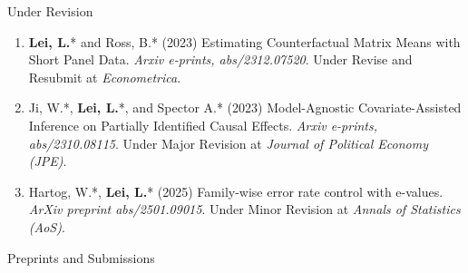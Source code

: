 \documentclass{article}
\begin{document}
\begin{large}
\noindent Under Revision
\end{large}

\begin{enumerate}
\item \textbf{Lei, L.}* and Ross, B.* (2023) Estimating Counterfactual Matrix Means with Short Panel Data. \emph{Arxiv e-prints, abs/2312.07520}. Under Revise and Resubmit at \emph{Econometrica}.
\item Ji, W.*, \textbf{Lei, L.}*, and Spector A.* (2023) Model-Agnostic Covariate-Assisted Inference on Partially Identified Causal Effects. \emph{Arxiv e-prints, abs/2310.08115}. Under Major Revision at \emph{Journal of Political Economy (JPE)}.
\item Hartog, W.*, \textbf{Lei, L.}* (2025) Family-wise error rate control with e-values. \emph{ArXiv preprint abs/2501.09015}. Under Minor Revision at \emph{Annals of Statistics (AoS)}.
\end{enumerate}

\begin{large}
\noindent Preprints and Submissions
\end{large}
\end{document}
